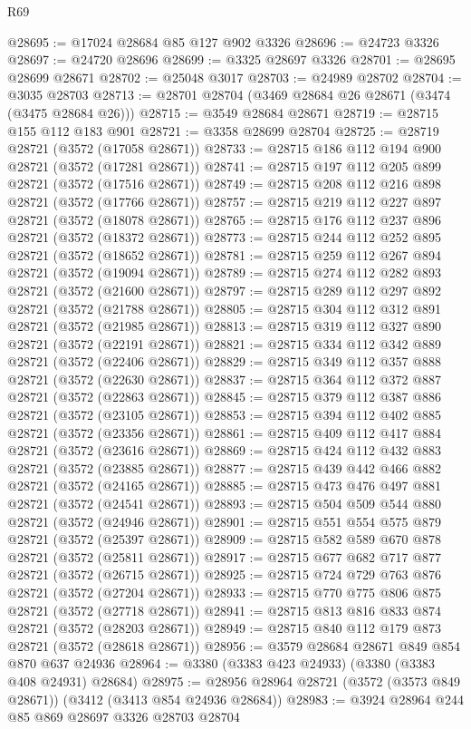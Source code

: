 \begin{lexlean}{R69}
\begin{coremodule}
@28695 := @17024 @28684 @85 @127 @902 @3326
@28696 := @24723 @3326
@28697 := @24720 @28696
@28699 := @3325 @28697 @3326
@28701 := @28695 @28699 @28671
@28702 := @25048 @3017
@28703 := @24989 @28702
@28704 := @3035 @28703
@28713 := @28701 @28704 (@3469 @28684 @26 @28671 (@3474 (@3475 @28684 @26)))
@28715 := @3549 @28684 @28671
@28719 := @28715 @155 @112 @183 @901
@28721 := @3358 @28699 @28704
@28725 := @28719 @28721 (@3572 (@17058 @28671))
@28733 := @28715 @186 @112 @194 @900 @28721 (@3572 (@17281 @28671))
@28741 := @28715 @197 @112 @205 @899 @28721 (@3572 (@17516 @28671))
@28749 := @28715 @208 @112 @216 @898 @28721 (@3572 (@17766 @28671))
@28757 := @28715 @219 @112 @227 @897 @28721 (@3572 (@18078 @28671))
@28765 := @28715 @176 @112 @237 @896 @28721 (@3572 (@18372 @28671))
@28773 := @28715 @244 @112 @252 @895 @28721 (@3572 (@18652 @28671))
@28781 := @28715 @259 @112 @267 @894 @28721 (@3572 (@19094 @28671))
@28789 := @28715 @274 @112 @282 @893 @28721 (@3572 (@21600 @28671))
@28797 := @28715 @289 @112 @297 @892 @28721 (@3572 (@21788 @28671))
@28805 := @28715 @304 @112 @312 @891 @28721 (@3572 (@21985 @28671))
@28813 := @28715 @319 @112 @327 @890 @28721 (@3572 (@22191 @28671))
@28821 := @28715 @334 @112 @342 @889 @28721 (@3572 (@22406 @28671))
@28829 := @28715 @349 @112 @357 @888 @28721 (@3572 (@22630 @28671))
@28837 := @28715 @364 @112 @372 @887 @28721 (@3572 (@22863 @28671))
@28845 := @28715 @379 @112 @387 @886 @28721 (@3572 (@23105 @28671))
@28853 := @28715 @394 @112 @402 @885 @28721 (@3572 (@23356 @28671))
@28861 := @28715 @409 @112 @417 @884 @28721 (@3572 (@23616 @28671))
@28869 := @28715 @424 @112 @432 @883 @28721 (@3572 (@23885 @28671))
@28877 := @28715 @439 @442 @466 @882 @28721 (@3572 (@24165 @28671))
@28885 := @28715 @473 @476 @497 @881 @28721 (@3572 (@24541 @28671))
@28893 := @28715 @504 @509 @544 @880 @28721 (@3572 (@24946 @28671))
@28901 := @28715 @551 @554 @575 @879 @28721 (@3572 (@25397 @28671))
@28909 := @28715 @582 @589 @670 @878 @28721 (@3572 (@25811 @28671))
@28917 := @28715 @677 @682 @717 @877 @28721 (@3572 (@26715 @28671))
@28925 := @28715 @724 @729 @763 @876 @28721 (@3572 (@27204 @28671))
@28933 := @28715 @770 @775 @806 @875 @28721 (@3572 (@27718 @28671))
@28941 := @28715 @813 @816 @833 @874 @28721 (@3572 (@28203 @28671))
@28949 := @28715 @840 @112 @179 @873 @28721 (@3572 (@28618 @28671))
@28956 := @3579 @28684 @28671 @849 @854 @870 @637 @24936
@28964 := @3380 (@3383 @423 @24933) (@3380 (@3383 @408 @24931) @28684)
@28975 := @28956 @28964 @28721 (@3572 (@3573 @849 @28671)) (@3412 (@3413 @854 @24936 @28684))
@28983 := @3924 @28964 @244 @85 @869 @28697 @3326 @28703 @28704

\end{coremodule}
\end{lexlean}
